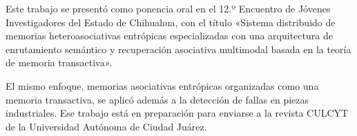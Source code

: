 Este trabajo se presentó como ponencia oral en el 12.º Encuentro de Jóvenes Investigadores
del Estado de Chihuahua, con el título «Sistema distribuido de memorias heteroasociativas
entrópicas especializadas con una arquitectura de enrutamiento semántico y recuperación
asociativa multimodal basada en la teoría de memoria transactiva».

El mismo enfoque, memorias asociativas entrópicas organizadas como una memoria
transactiva, se aplicó además a la detección de fallas en piezas industriales.
Ese trabajo está en preparación para enviarse a la revista CULCYT de la Universidad
Autónoma de Ciudad Juárez.
